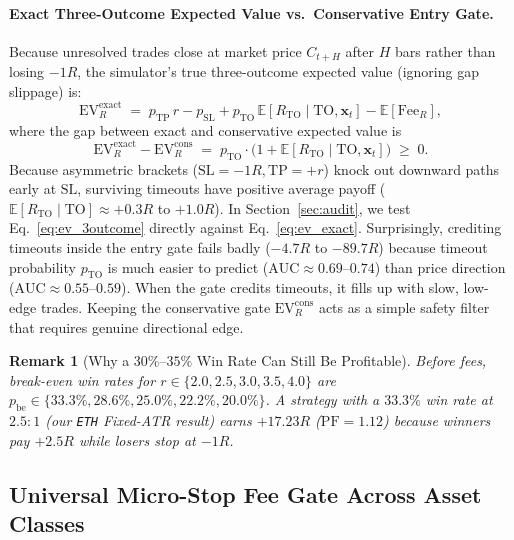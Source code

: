 \documentclass{article}
\newtheorem{remark}{Remark}
\newcommand{\EVR}{\mathrm{EV}_R}
\newcommand{\FeeR}{\mathrm{Fee}_R}
\newcommand{\TP}{\mathrm{TP}}
\newcommand{\SL}{\mathrm{SL}}
\newcommand{\PF}{\mathrm{PF}}
\begin{document}
\paragraph{Exact Three-Outcome Expected Value vs.\ Conservative Entry Gate.}
Because unresolved trades close at market price $C_{t+H}$ after $H$ bars rather than losing $-1R$, the simulator's true three-outcome expected value (ignoring gap slippage) is:
\begin{equation}
  \EVR^{\mathrm{exact}}
  \;=\; p_{\TP}\,r - p_{\SL} + p_{\mathrm{TO}}\,\mathbb{E}[R_{\mathrm{TO}} \mid \mathrm{TO}, \mathbf{x}_t] - \mathbb{E}[\FeeR],
  \label{eq:ev_3outcome}
\end{equation}
where the gap between exact and conservative expected value is
\begin{equation}
  \EVR^{\mathrm{exact}} - \EVR^{\mathrm{cons}}
  \;=\; p_{\mathrm{TO}}\cdot\bigl(1 + \mathbb{E}[R_{\mathrm{TO}} \mid \mathrm{TO}, \mathbf{x}_t]\bigr) \;\ge\; 0.
  \label{eq:ev_gap}
\end{equation}
Because asymmetric brackets ($\SL = -1R, \TP = +r$) knock out downward paths early at $\SL$, surviving timeouts have positive average payoff ($\mathbb{E}[R_{\mathrm{TO}} \mid \mathrm{TO}] \approx +0.3R$ to $+1.0R$). In Section~\ref{sec:audit}, we test Eq.~\eqref{eq:ev_3outcome} directly against Eq.~\eqref{eq:ev_exact}. Surprisingly, crediting timeouts inside the entry gate fails badly ($-4.7R$ to $-89.7R$) because timeout probability $p_{\mathrm{TO}}$ is much easier to predict ($\mathrm{AUC} \approx 0.69$--$0.74$) than price direction ($\mathrm{AUC} \approx 0.55$--$0.59$). When the gate credits timeouts, it fills up with slow, low-edge trades. Keeping the conservative gate $\EVR^{\mathrm{cons}}$ acts as a simple safety filter that requires genuine directional edge.

\begin{remark}[Why a $30\%$--$35\%$ Win Rate Can Still Be Profitable]
\label{rem:asymmetric}
Before fees, break-even win rates for $r \in \{2.0, 2.5, 3.0, 3.5, 4.0\}$ are $p_{\mathrm{be}} \in \{33.3\%, 28.6\%, 25.0\%, 22.2\%, 20.0\%\}$. A strategy with a $33.3\%$ win rate at $2.5{:}1$ (our \texttt{ETH} Fixed-ATR result) earns $+17.23R$ ($\PF = 1.12$) because winners pay $+2.5R$ while losers stop at $-1R$.
\end{remark}

\subsection{Universal Micro-Stop Fee Gate Across Asset Classes}
\end{document}
